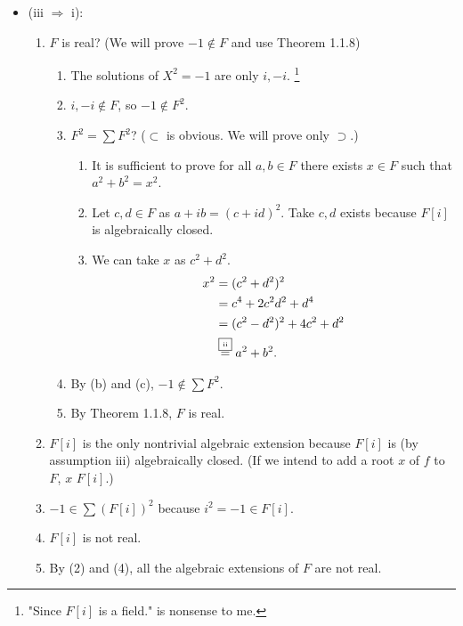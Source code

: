 \documentclass[9pt]{ltjsarticle}
\begin{document}
\begin{itemize}
\begin{itemize}
\begin{enumerate}
    \end{enumerate}
    \item
    (iii $\Rightarrow$ i):
    \begin{enumerate}
      \item
      $F$ is real? (We will prove $-1\notin F$ and use Theorem 1.1.8)
      \begin{enumerate}
        \item The solutions of $X^2 = -1$ are only $i, -i$.
        \footnote{"Since $F[i]$ is a field." is nonsense to me.}
        \item
        $i,-i \notin F$, so $-1 \notin F^2$.
        \item
        $F^2 = \sum F^2$? ($\subset$ is obvious.  We will prove only $\supset$.)
        \begin{enumerate}
          \item
          It is sufficient to prove for all $a,b\in F$ there exists $x\in F$ such that $a^2 + b^2 = x^2$.
          \item
          Let $c,d\in F$ as $a+ib = (c+id)^2$.
          Take $c,d$ exists because $F[i]$ is algebraically closed.
          \item
          We can take $x$ as $c^2+d^2$.\pf
          \begin{align}
            x^2
            &=
            (c^2 + d^2)^2\\
            &=
            c^4 + 2c^2d^2 + d^4\\
            &=
            (c^2-d^2)^2 + 4c^2+d^2\\
            &\overset{\text{\fbox{\tiny ii}}}{=}
            a^2 + b^2.
          \end{align}
        \end{enumerate}
        \item
        By (b) and (c), $-1 \notin \sum F^2$.
        \item
        By Theorem 1.1.8, $F$ is real.
      \end{enumerate}
      \item
      $F[i]$ is the only nontrivial algebraic extension
      because $F[i]$ is (by assumption iii) algebraically closed.
      (If we intend to add a root $x$ of $f$ to $F$, $x$ \in $F[i]$.)
      \item
      $-1 \in \sum(F[i])^2$ because $i^2 = -1 \in F[i]$.
      \item
      $F[i]$ is not real.
      \item
      By (2) and (4), all the algebraic extensions of $F$ are not real.

\end{enumerate}
\end{itemize}
\end{itemize}
\end{document}
